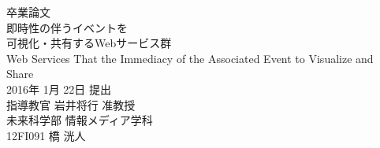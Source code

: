 \thispagestyle{empty}
\begin{center}
\vspace*{-1cm}
\Huge{卒業論文}\\
\vspace{1cm}
\LARGE{即時性の伴うイベントを\\可視化・共有するWebサービス群}\\
\vspace{0.2cm}
\large{Web Services That the Immediacy of the Associated Event to Visualize and Share}\\
\vspace{2cm}
\Large{2016年 1月 22日 提出}\\
\vspace{2cm}
\LARGE{指導教官 岩井将行 准教授}\\
\vspace{1cm}
\LARGE{未来科学部 情報メディア学科}\\
\vspace{1cm}
\huge{12FI091 橋 洸人}\\
\end{center}
